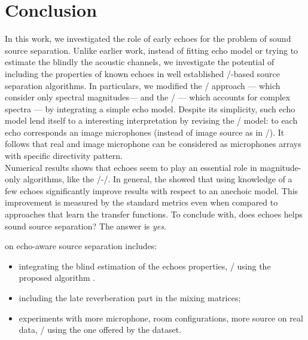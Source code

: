 \section{Conclusion}
In this work, we investigated the role of early echoes for the problem of sound source separation.
Unlike earlier work, instead of fitting echo model or trying to estimate the blindly the acoustic channels,
we investigate the potential of including the properties of known echoes in well established \NMF/-based source separation algorithms.
In particulars, we modified the \MU/ approach --- which consider only spectral magnitudes--- and the \EM/ --- which accounts for complex spectra ---
by integrating a simple echo model.
Despite its simplicity, such echo model lend itself to a interesting interpretation by revising the \ISM/ model:
to each echo corresponds an image microphones (instead of image source as in \ISM/).
It follows that real and image microphone can be considered as microphones arrays with specific directivity pattern.
\\Numerical results shows that echoes seem to play an essential role in magnitude-only algorithms, like the \MU/-\NMF/.
In general, the showed that using knowledge of a few echoes significantly improve results with respect to an anechoic model.
This improvement is measured by the standard metrics even when compared to approaches that learn the transfer functions.
To conclude with, does echoes helps sound source separation? The answer is \textit{yes}.

 on echo-aware source separation includes:
\begin{itemize}
    \item integrating the blind estimation of the echoes properties, \eg/ using the proposed algorithm \blaster{}.
    \item including the late reverberation part in the mixing matrices;
    \item experiments with more microphone, room configurations, more source on real data, \eg/ using the one offered by the \dEchorate{} dataset.
\end{itemize}
